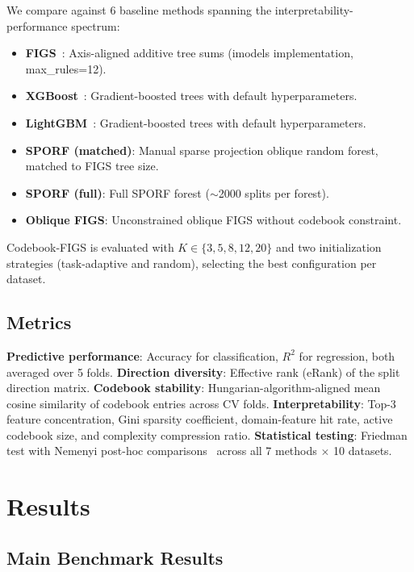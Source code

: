 \documentclass[11pt,letterpaper]{article}
\begin{document}
We compare against 6 baseline methods spanning the interpretability-performance spectrum:
\begin{itemize}[leftmargin=*]
    \item \textbf{FIGS}~\citep{Tan2022}: Axis-aligned additive tree sums (imodels implementation, max\_rules=12).
    \item \textbf{XGBoost}~\citep{Chen2016}: Gradient-boosted trees with default hyperparameters.
    \item \textbf{LightGBM}~\citep{Ke2017}: Gradient-boosted trees with default hyperparameters.
    \item \textbf{SPORF (matched)}: Manual sparse projection oblique random forest, matched to FIGS tree size.
    \item \textbf{SPORF (full)}: Full SPORF forest ($\sim$2000 splits per forest).
    \item \textbf{Oblique FIGS}: Unconstrained oblique FIGS without codebook constraint.
\end{itemize}
Codebook-FIGS is evaluated with $K \in \{3, 5, 8, 12, 20\}$ and two initialization strategies (task-adaptive and random), selecting the best configuration per dataset.

\subsection{Metrics}

\textbf{Predictive performance}: Accuracy for classification, $R^2$ for regression, both averaged over 5 folds. \textbf{Direction diversity}: Effective rank (eRank) of the split direction matrix. \textbf{Codebook stability}: Hungarian-algorithm-aligned mean cosine similarity of codebook entries across CV folds. \textbf{Interpretability}: Top-3 feature concentration, Gini sparsity coefficient, domain-feature hit rate, active codebook size, and complexity compression ratio. \textbf{Statistical testing}: Friedman test with Nemenyi post-hoc comparisons~\citep{Demsar2006} across all 7 methods $\times$ 10 datasets.

\section{Results}

\subsection{Main Benchmark Results}
\end{document}

